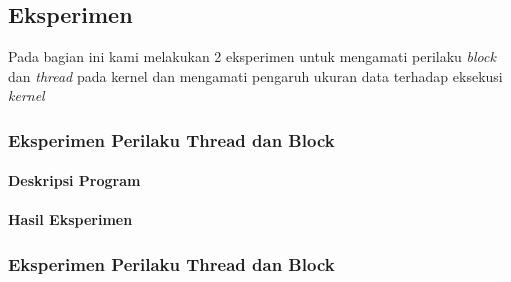 \chapter{\topikSatu}

\section{Eksperimen}
Pada bagian ini kami melakukan 2 eksperimen untuk mengamati perilaku \textit{block} dan \textit{thread} pada kernel dan mengamati pengaruh ukuran data terhadap eksekusi \textit{kernel}

\subsection{Eksperimen Perilaku Thread dan Block} 

\todo{}

\subsubsection{Deskripsi Program}

\todo{}

\subsubsection{Hasil Eksperimen}

\todo{}

%

\subsection{Eksperimen Perilaku Thread dan Block} 

